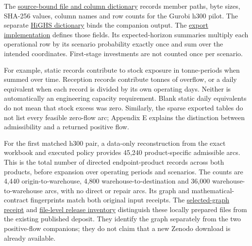 \documentclass[
  english,
  11pt,
  a4paper,
]{article}
\begin{document}
The
\href{https://github.com/unb-lamfo-or-ai-hpc/model-agrologistic/blob/8f33a360d8a1ca3f18c5c7a3aa0eac2cd2ad5a90/docs/evidence/paired_h300_release_dictionary_20261101.json}{source-bound
file and column dictionary} records member paths, byte sizes, SHA-256
values, column names and row counts for the Gurobi h300 pilot. The
separate
\href{https://github.com/unb-lamfo-or-ai-hpc/model-agrologistic/blob/083ef96cc99a346204df22551ce0739c10e8a2f7/docs/evidence/paired_h300_highs_release_dictionary_20261101.json}{HiGHS
dictionary} binds the companion output. The
\href{https://github.com/unb-lamfo-or-ai-hpc/model-agrologistic/blob/c493be8cd127c5175fc7eb111400229e64b8e3c0/src/logic/experiment_runner.py}{export
implementation} defines those fields. Its expected-horizon summaries
multiply each operational row by its scenario probability exactly once
and sum over the intended coordinates. First-stage investments are not
counted once per scenario.

For example, static records contribute to stock exposure in
tonne-periods when summed over time. Reception records contribute tonnes
of overflow, or a daily equivalent when each record is divided by its
own operating days. Neither is automatically an engineering capacity
requirement. Blank static daily equivalents do not mean that stock
excess was zero. Similarly, the sparse exported tables do not list every
feasible zero-flow arc; Appendix E explains the distinction between
admissibility and a returned positive flow.

For the first matched h300 pair, a data-only reconstruction from the
exact workbook and executed policy provides 45,240 product-specific
admissible arcs. This is the total number of directed endpoint-product
records across both products, before expansion over operating periods
and scenarios. The counts are 4,440 origin-to-warehouse, 4,800
warehouse-to-destination and 36,000 warehouse-to-warehouse arcs, with no
direct or repair arcs. Its graph and mathematical-contract fingerprints
match both original input receipts. The
\href{https://github.com/unb-lamfo-or-ai-hpc/model-agrologistic/blob/0f63c10eb1abf88318a4d9c6afc75fcac97f6266/docs/evidence/h300_selected_graph_release_20261101.json}{selected-graph
receipt} and
\href{https://github.com/unb-lamfo-or-ai-hpc/model-agrologistic/blob/0f63c10eb1abf88318a4d9c6afc75fcac97f6266/data/manifests/zenodo_next_release_inventory_20261101.json}{file-level
release inventory} distinguish these locally prepared files from the
existing published deposit. They identify the graph separately from the
two positive-flow companions; they do not claim that a new Zenodo
download is already available.
\end{document}
